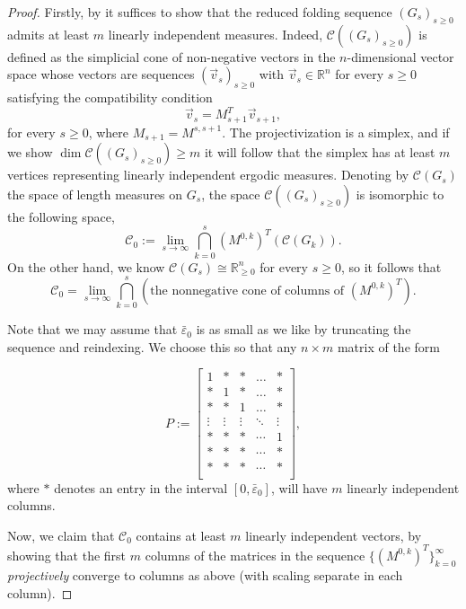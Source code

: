 \documentclass[11pt, letterpaper]{amsart}
\theoremstyle{plain}
\theoremstyle{definition}
\newcommand{\R}{\mathbb{R}}
\newcommand{\calC}{\mathcal{C}}
\renewcommand{\epsilon}{\varepsilon}
\begin{document}
\begin{proof}
    Firstly, by  it suffices to show
    that the reduced folding sequence $(G_s)_{s \ge 0}$ admits at least $m$
    linearly independent measures. Indeed, $\calC((G_s)_{s \ge 0})$ is
    defined as the simplicial cone of non-negative vectors in the $n$-dimensional vector space whose vectors are sequences $(\vec{v}_s)_{s \ge 0}$ with $\vec{v}_s \in \R^n$  for every $s \ge 0$ satisfying the compatibility condition
    \[
        \vec{v}_{s} = M_{s+1}^T\vec{v}_{s+1},
    \]
    for every $s \ge 0$, where $M_{s+1}=M^{s,s+1}$. The
    projectivization is a simplex, and if we show $\dim \calC((G_s)_{s
      \ge 0})\geq m$ it will follow that the simplex has at least $m$
    vertices representing linearly independent ergodic measures.
    Denoting by $\calC(G_s)$ the space of length measures on $G_s$, the space $\mathcal{C}((G_s)_{s \ge 0})$ is isomorphic to the following space,
    \[
        \mathcal{C}_0 := \lim_{s \to \infty} \bigcap_{k=0}^s (M^{0,k})^T(\calC(G_k)).
    \]
    On the other hand, we know  $\calC(G_s) \cong \R_{\geq 0}^n$ for every $s \ge 0$, so it follows that
    \[
        \mathcal{C}_0 = \lim_{s \to \infty} \bigcap_{k = 0}^s \left(\text{the nonnegative cone of columns of $(M^{0,k})^T$}\right).
    \]

    Note that we may assume that $\bar\epsilon_0$ is as small as we
    like by truncating the sequence and reindexing. We choose this so
    that any $n\times m$ matrix of the form
    
    \[
    P:=
    \begin{bmatrix}
        1 & * & * & \ldots & * \\
        * & 1 & * & \ldots & * \\
        * & * & 1 & \ldots & * \\
        \vdots & \vdots & \vdots & \ddots & \vdots \\
        * & * & * & \cdots & 1 \\
        * & * & * & \cdots & * \\
        * & * & * & \cdots & * \\
    \end{bmatrix},
    \]
    where $*$ denotes an entry in the interval $[0,\bar\epsilon_0]$, will have $m$
    linearly independent columns.

    Now, we claim that $\mathcal{C}_0$ contains at least $m$ linearly independent
    vectors, by showing that the first $m$ columns of the matrices in the
    sequence $\{(M^{0,k})^T\}_{k=0}^{\infty}$ \emph{projectively}
    converge to columns as above (with scaling separate in each column).



\end{proof}
\end{document}
